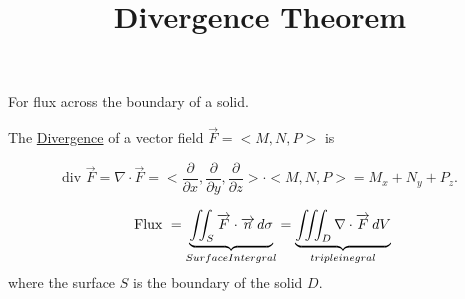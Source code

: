 \documentclass{ximera}
\title[Dig-In:]{Divergence Theorem}
\begin{document}
\begin{abstract}
\end{abstract}
\maketitle

For flux across the boundary of a solid.

\begin{definition}
The \underline{Divergence} of a vector field $\overrightarrow{F} = <M, N, P>$ is

\[
\text{div }\overrightarrow{F} = \nabla \cdot \overrightarrow{F} = <\frac{\partial}{\partial x}, \frac{\partial}{\partial y}, \frac{\partial}{\partial z}> \cdot <M,N,P> = M_x + N_y + P_z. 
\]
\end{definition}

\begin{theorem}
\[
\text{ Flux } = \underbrace{\iint_S \overrightarrow{F} \cdot \overrightarrow{n} \mathop{}\!d \sigma}_{Surface Intergral}
= \underbrace{\iiint_D \nabla\cdot \overrightarrow{F} \mathop{}\!d V}_{triple inegral}
\]
where the surface $S$ is the boundary of the solid $D$.
\end{theorem}
\end{document}

